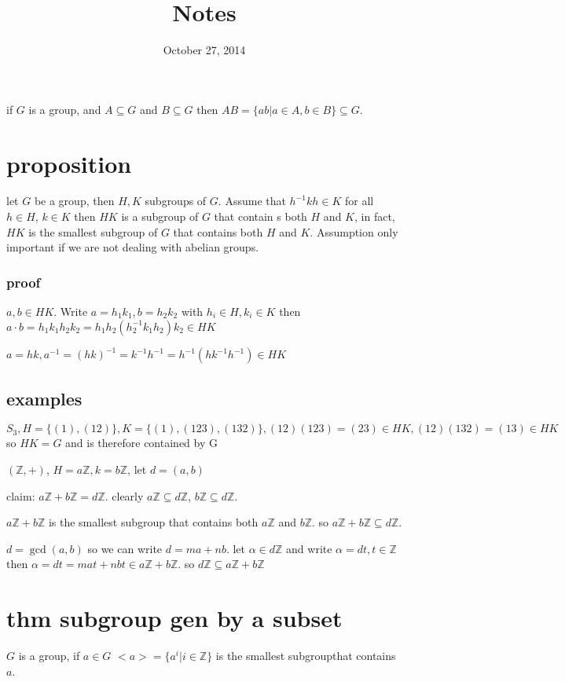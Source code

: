 \documentclass[letterpaper]{article}
\begin{document}
\title{Notes}
\date{October 27, 2014}
\maketitle
if $G$ is a group, and $A\subseteq G$ and $B\subseteq G$ then $AB=\{ab|a\in A, b\in B\}\subseteq G$.

\section*{proposition}

let $G$ be a group, then $H,K$ subgroups of $G$. Assume that $h^{-1}kh\in K$ for all $h\in H$, $k\in K$ then $HK$ is a subgroup of $G$ that contain s both $H$ and $K$, in fact, $HK$ is the smallest subgroup of $G$ that contains both $H$ and $K$. Assumption only important if we are not dealing with abelian groups.

\subsubsection*{proof}
$a,b\in HK$. Write $a=h_1k_1,b=h_2k_2$ with $h_i\in H,k_i\in K$ then $a\cdot b=h_1k_1h_2k_2=h_1h_2(h_2^{-1}k_1h_2)k_2\in HK$

$a=hk, a^{-1}=(hk)^{-1}=k^{-1}h^{-1}=h^{-1}(hk^{-1}h^{-1})\in HK$

\subsection*{examples}
$S_3, H=\{(1),(12)\}, K=\{(1),(123),(132)\}, (12)(123)=(23)\in HK, (12)(132)=(13)\in HK$ so $HK=G$ and is therefore contained by G

$(\mathbb{Z},+)$, $H=a\mathbb{Z}, k=b\mathbb{Z}$, let $d=(a,b)$

claim: $a\mathbb{Z}+b\mathbb{Z}=d\mathbb{Z}$. clearly $a\mathbb{Z}\subseteq d\mathbb{Z}$, $b\mathbb{Z}\subseteq d\mathbb{Z}$. 

$a\mathbb{Z}+b\mathbb{Z}$ is the smallest subgroup that contains both $a\mathbb{Z}$ and $b\mathbb{Z}$. so $a\mathbb{Z}+b\mathbb{Z}\subseteq d\mathbb{Z}$.

$d=\gcd(a,b)$ so we can write $d=ma+nb$. let $\alpha\in d\mathbb{Z}$ and write $\alpha=dt, t\in \mathbb{Z}$ then $\alpha=dt=mat+nbt\in a\mathbb{Z}+b\mathbb{Z}$. so $d\mathbb{Z}\subseteq a\mathbb{Z}+b\mathbb{Z}$ 
\section*{thm subgroup gen by a subset}
$G$ is a group, if $a\in G$ $<a>=\{a^i|i\in \mathbb{Z}\}$ is the smallest subgroupthat contains $a$.
\end{document}
